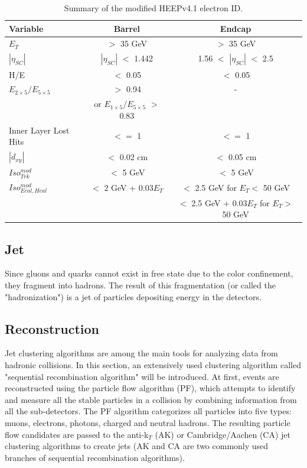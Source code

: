 \begin{table}[hbtp]
  \begin{center}
    \begin{tabular}{|l|c|c|}
      \hline
      Variable & Barrel & Endcap \\\hline
      $E_{T}$ & $>$ 35 GeV & $>$ 35 GeV \\
      $|\eta_{SC}|$ & $|\eta_{SC}|$ $<$ 1.442 & 1.56 $<$ $|\eta_{SC}|$ $<$ 2.5 \\
      H/E & $<$ 0.05 & $<$ 0.05 \\ 
      $E_{2\times5}/E_{5\times5}$ & $>$ 0.94 & - \\
      & or $E_{1\times5}/E_{5\times5}$ $>$ 0.83 & \\ 
      Inner Layer Lost Hits & $<=$ 1 & $<=$ 1 \\
      $|d_{xy}|$ & $<$ 0.02 cm & $<$ 0.05 cm\\
      \hline
      $Iso_{Trk}^{mod}$  & $<$ 5 GeV& $<$ 5 GeV\\
      \hline
      $Iso_{Ecal, Hcal}^{mod}$  & $<$ 2 GeV + 0.03$E_{T}$ & $<$ 2.5 GeV for $E_{T} <$ 50 GeV \\
      & & $<$ 2.5 GeV + 0.03$E_{T}$ for $E_{T} >$ 50 GeV \\
      \hline
    \end{tabular}
    \caption{\label{tab:EleIDtable} Summary of the modified HEEPv4.1 electron ID.}
  \end{center}
\end{table}

\newpage
\subsection{Jet}
Since gluons and quarks cannot exist in free state due to the color confinement\cite{confinement}, they fragment into hadrons. The result of this fragmentation (or called the "hadronization") is a jet of particles depositing energy in the detectors.

\subsection*{Reconstruction}
Jet clustering algorithms are among the main tools for analyzing data from hadronic collisions. In this section, an extensively used clustering algorithm called "sequential recombination algorithm"\cite{AKalgo,CAalgo1} will be introduced. At first, events are reconstructed using the particle flow algorithm (PF)\cite{PFalgo}, which attempts to identify and measure all the stable particles in a collision by combining information from all the sub-detectors. The PF algorithm categorizes all particles into five types: muons, electrons, photons, charged and neutral hadrons. The resulting particle flow candidates are passed to the anti-k$_{T}$ (AK)\cite{AKalgo} or Cambridge/Aachen (CA)\cite{CAalgo1,CAalgo2} jet clustering algorithms to create jets (AK and CA are two commonly used branches of sequential recombination algorithms).

